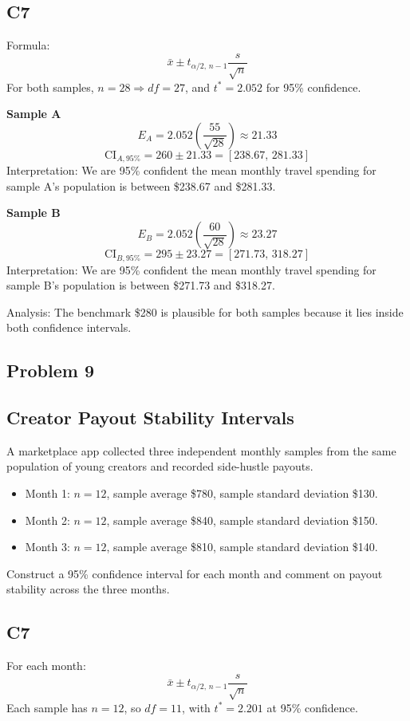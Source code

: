 \subsection*{C7}
Formula:
\[
\bar{x} \pm t_{\alpha/2,\,n-1}\frac{s}{\sqrt{n}}
\]
For both samples, \(n=28\Rightarrow df=27\), and \(t^*=2.052\) for 95\% confidence.

\textbf{Sample A}
\[
E_A=2.052\left(\frac{55}{\sqrt{28}}\right)\approx 21.33
\]
\[
\text{CI}_{A,95\%}=260\pm 21.33=[238.67,\,281.33]
\]
Interpretation: We are 95\% confident the mean monthly travel spending for sample A's population is between \$238.67 and \$281.33.

\textbf{Sample B}
\[
E_B=2.052\left(\frac{60}{\sqrt{28}}\right)\approx 23.27
\]
\[
\text{CI}_{B,95\%}=295\pm 23.27=[271.73,\,318.27]
\]
Interpretation: We are 95\% confident the mean monthly travel spending for sample B's population is between \$271.73 and \$318.27.

Analysis: The benchmark \$280 is plausible for both samples because it lies inside both confidence intervals.

\subsection*{Problem 9}
\subsection*{Creator Payout Stability Intervals}
A marketplace app collected three independent monthly samples from the same population of young creators and recorded side-hustle payouts.
\begin{itemize}
  \item Month 1: \(n=12\), sample average \$780, sample standard deviation \$130.
  \item Month 2: \(n=12\), sample average \$840, sample standard deviation \$150.
  \item Month 3: \(n=12\), sample average \$810, sample standard deviation \$140.
\end{itemize}
Construct a 95\% confidence interval for each month and comment on payout stability across the three months.

\subsection*{C7}
For each month:
\[
\bar{x} \pm t_{\alpha/2,\,n-1}\frac{s}{\sqrt{n}}
\]
Each sample has \(n=12\), so \(df=11\), with \(t^*=2.201\) at 95\% confidence.

